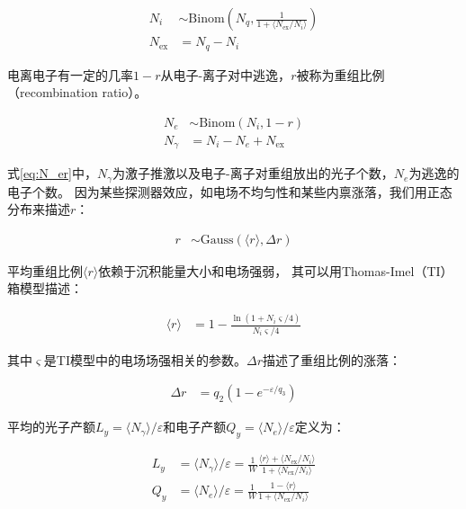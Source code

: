 \begin{align}
    \label{eq:N_iex}
    N_i &\sim \mathrm{Binom}\left(N_q,\frac{1}{1+\langle N_{\mathrm{ex}}/N_{i}\rangle}\right) \\
    N_{\mathrm{ex}} &= N_q - N_i
\end{align}

电离电子有一定的几率$1-r$从电子-离子对中逃逸，$r$被称为重组比例（\mbox{recombination} ratio）。

\begin{align}
    \label{eq:N_er}
    N_e &\sim \mathrm{Binom}\left(N_i,1-r\right) \\
    N_\gamma &= N_i - N_e + N_{\mathrm{ex}}
\end{align}

式\ref{eq:N_er}中，$N_\gamma$为激子推激以及电子-离子对重组放出的光子个数，$N_{e}$为逃逸的电子个数。
因为某些探测器效应，如电场不均匀性和某些内禀涨落\cite{lux_collaboration_tritium_2016}，我们用正态分布来描述$r$：

\begin{align}
    \label{eq:r}
    r &\sim \mathrm{Gauss}\left(\langle r\rangle,\Delta r\right)
\end{align}

平均重组比例$\langle r\rangle$依赖于沉积能量大小和电场强弱，
其可以用Thomas-Imel（TI）箱模型描述\cite{thomas_recombination_1987}：

\begin{align}
    \label{eq:mr}
    \langle r\rangle &= 1 - \frac{\ln{\left(1+N_i\varsigma/4\right)}}{N_i\varsigma/4}
\end{align}

其中$\varsigma$是TI模型中的电场场强相关的参数。$\Delta r$描述了重组比例的涨落：

\begin{align}
    \label{eq:sr}
    \Delta r &= q_2\left(1-e^{-\varepsilon /q_3}\right)
\end{align}

平均的光子产额$L_y=\langle N_\gamma\rangle/\varepsilon $和电子产额$Q_y=\langle N_e\rangle/\varepsilon $定义为：

\begin{align}
    \label{eq:N_g}
    L_y &= \langle N_\gamma\rangle/\varepsilon  = \frac{1}{W}\frac{\langle r\rangle+\langle N_{\mathrm{ex}}/N_i\rangle}{1+\langle N_{\mathrm{ex}}/N_i\rangle} \\
    \label{eq:N_e}
    Q_y &= \langle N_e\rangle/\varepsilon  = \frac{1}{W}\frac{1-\langle r\rangle}{1+\langle N_{\mathrm{ex}}/N_i\rangle}
\end{align}

